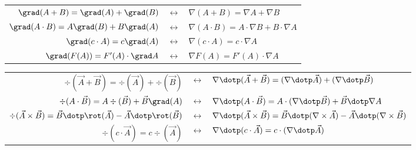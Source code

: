\begin{center}
    \begin{tabular}[]{r c l}
        $ \grad(A+B) = \grad(A) + \grad (B) $ & $\leftrightarrow$ & $ \nabla (A + B) = \nabla A + \nabla B $ \\
        $ \grad(A \cdot B) = A \grad(B) + B \grad (A) $ & $\leftrightarrow$ & $ \nabla (A \cdot B) = A \cdot \nabla B + B \cdot \nabla A $ \\
        $ \grad(c \cdot A) = c \grad(A) $ & $\leftrightarrow$ & $ \nabla (c \cdot A) = c \cdot \nabla A $ \\
        $ \grad(F(A)) = F'(A) \cdot \grad A $ & $\leftrightarrow$ & $ \nabla F(A) = F'(A) \cdot \nabla A $ \\
    \end{tabular}
\end{center}

\begin{center}
    \begin{tabular}[]{r c l}
        $ \div(\vec{A}+\vec{B}) = \div (\vec{A}) + \div (\vec{B}) $ & $\leftrightarrow$ & $ \nabla \dotp (\vec{A} + \vec{B}) = (\nabla \dotp \vec{A}) + (\nabla \dotp \vec{B}) $ \\
        $ \div(A \cdot \vec{B}) = A \div (\vec{B}) + \vec{B} \grad (A) $ & $\leftrightarrow$ & $ \nabla \dotp (A \cdot \vec{B}) = A \cdot (\nabla \dotp \vec{B}) + \vec{B} \dotp \nabla A $ \\
        $ \div(\vec{A} \times \vec{B}) = \vec{B} \dotp \rot (\vec{A}) - \vec{A} \dotp \rot(\vec{B}) $ & $\leftrightarrow$ & $ \nabla \dotp (\vec{A} \times \vec{B}) = \vec{B} \dotp (\nabla \times \vec{A}) - \vec{A} \dotp (\nabla \times \vec{B}) $ \\
        $ \div(c \cdot \vec{A}) = c \div(\vec{A}) $ & $\leftrightarrow$ & $ \nabla \dotp (c \cdot \vec{A}) = c \cdot (\nabla \dotp \vec{A}) $ \\
    \end{tabular}
\end{center}

